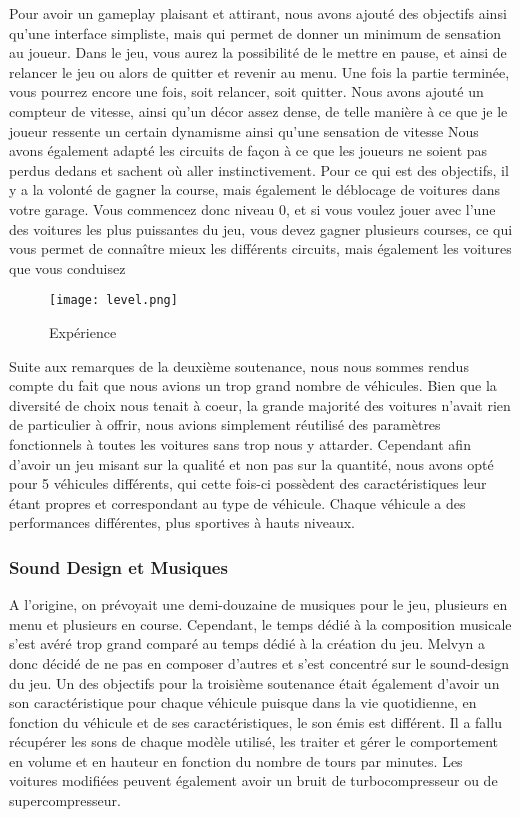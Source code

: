 \documentclass[a4paper,12pt]{article}
\begin{document}
            Pour avoir un gameplay plaisant et attirant, nous avons ajouté des objectifs ainsi qu'une interface simpliste, mais qui permet de donner un minimum de sensation au joueur. Dans le jeu, vous aurez la possibilité de le mettre en pause, et ainsi de relancer le jeu ou alors de quitter et revenir au menu. Une fois la partie terminée, vous pourrez encore une fois, soit relancer, soit quitter. Nous avons ajouté un compteur de vitesse, ainsi qu'un décor assez dense, de telle manière à ce que je le joueur ressente un certain dynamisme ainsi qu'une sensation de vitesse Nous avons également adapté les circuits de façon à ce que les joueurs ne soient pas perdus dedans et sachent où aller instinctivement. Pour ce qui est des objectifs, il y a la volonté de gagner la course, mais également le déblocage de voitures dans votre garage. Vous commencez donc niveau 0, et si vous voulez jouer avec l'une des voitures les plus puissantes du jeu, vous devez gagner plusieurs courses, ce qui vous permet de connaître mieux les différents circuits, mais également les voitures que vous conduisez   
            \begin{figure}[h]
                \centering
                \texttt{[image: level.png]}
                \caption{Expérience}
            \end{figure}
            Suite aux remarques de la deuxième soutenance, nous nous sommes rendus compte du fait que nous avions un trop grand nombre de véhicules. Bien que la diversité de choix nous tenait à coeur, la grande majorité des voitures n'avait rien de particulier à offrir, nous avions simplement réutilisé des paramètres fonctionnels à toutes les voitures sans trop nous y attarder. Cependant afin d'avoir un jeu misant sur la qualité et non pas sur la quantité, nous avons opté pour 5 véhicules différents, qui cette fois-ci possèdent des caractéristiques leur étant propres et correspondant au type de véhicule. Chaque véhicule a des performances différentes, plus sportives à hauts niveaux.
            
            \subsubsection{Sound Design et Musiques}
            
            A l'origine, on prévoyait une demi-douzaine de musiques pour le jeu, plusieurs en menu et plusieurs en course. Cependant, le temps dédié à la composition musicale s'est avéré trop grand comparé au temps dédié à la création du jeu. Melvyn a donc décidé de ne pas en composer d'autres et s'est concentré sur le sound-design du jeu. Un des objectifs pour la troisième soutenance était également d'avoir un son caractéristique pour chaque véhicule puisque dans la vie quotidienne, en fonction du véhicule et de ses caractéristiques, le son émis est différent. Il a fallu récupérer les sons de chaque modèle utilisé, les traiter et gérer le comportement en volume et en hauteur en fonction du nombre de tours par minutes. Les voitures modifiées peuvent également avoir un bruit de turbocompresseur ou de supercompresseur.
            
\end{document}
